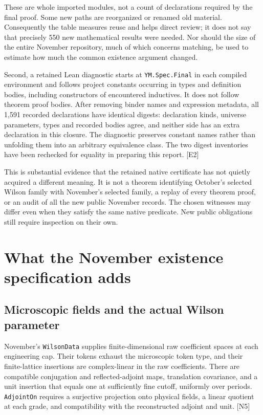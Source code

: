 \documentclass[11pt]{article}
\newcommand{\code}[1]{{\small\nolinkurl{#1}}}
\newcommand{\src}[1]{\textsf{[#1]}}
\begin{document}
These are whole imported modules, not a count of declarations required by
the final proof. Some new paths are reorganized or renamed old material.
Consequently the table measures reuse and helps direct review; it does not
say that precisely 550 new mathematical results were needed. Nor should the
size of the entire November repository, much of which concerns matching,
be used to estimate how much the common existence argument changed.

Second, a retained Lean diagnostic starts at \code{YM.Spec.Final} in each
compiled environment and follows project constants occurring in types and
definition bodies, including constructors of encountered inductives. It
does not follow theorem proof bodies. After removing binder names and
expression metadata, all 1,591 recorded declarations have identical
digests: declaration kinds, universe parameters, types and recorded bodies
agree, and neither side has an extra declaration in this closure. The
diagnostic preserves constant names rather than unfolding them into an
arbitrary equivalence class. The two digest inventories have been rechecked
for equality in preparing this report. \src{E2}

This is substantial evidence that the retained native certificate has not
quietly acquired a different meaning. It is not a theorem identifying
October's selected Wilson family with November's selected family, a replay
of every theorem proof, or an audit of all the new public November records.
The chosen witnesses may differ even when they satisfy the same native
predicate. New public obligations still require inspection on their own.

\section{What the November existence specification adds}
\label{sec:additions}

\subsection{Microscopic fields and the actual Wilson parameter}

November's \code{WilsonData} supplies finite-dimensional raw coefficient
spaces at each engineering cap. Their tokens exhaust the microscopic token
type, and their finite-lattice insertions are complex-linear in the raw
coefficients. There are compatible conjugation and reflected-adjoint maps,
translation covariance, and a unit insertion that equals one at sufficiently
fine cutoff, uniformly over periods. \code{AdjointOn} requires a surjective
projection onto physical fields, a linear quotient at each grade, and
compatibility with the reconstructed adjoint and unit. \src{N5}
\end{document}
